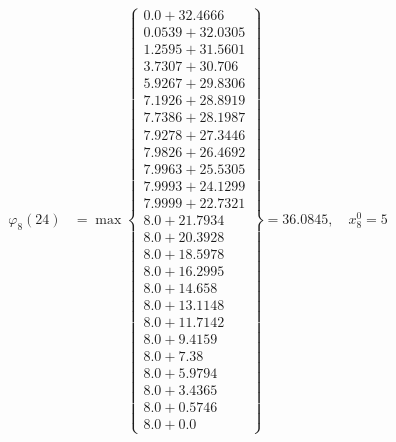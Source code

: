 \documentclass{article}
\begin{document}
\begin{align*}
  
\varphi_{8}(24) &= \max \left\{ \begin{array}{c}
0.0 + 32.4666 \\
 0.0539 + 32.0305 \\
 1.2595 + 31.5601 \\
 3.7307 + 30.706 \\
 5.9267 + 29.8306 \\
 7.1926 + 28.8919 \\
 7.7386 + 28.1987 \\
 7.9278 + 27.3446 \\
 7.9826 + 26.4692 \\
 7.9963 + 25.5305 \\
 7.9993 + 24.1299 \\
 7.9999 + 22.7321 \\
 8.0 + 21.7934 \\
 8.0 + 20.3928 \\
 8.0 + 18.5978 \\
 8.0 + 16.2995 \\
 8.0 + 14.658 \\
 8.0 + 13.1148 \\
 8.0 + 11.7142 \\
 8.0 + 9.4159 \\
 8.0 + 7.38 \\
 8.0 + 5.9794 \\
 8.0 + 3.4365 \\
 8.0 + 0.5746 \\
 8.0 + 0.0
\end{array} \right\}=36.0845,\quad x_{8}^0=5\\
  
  
  

\end{align*}
\end{document}
